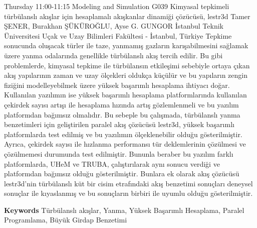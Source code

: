 
    \begin{abstract_basarim}
    {Thursday 11:00-11:15}
    {Modeling and Simulation}
    {G039}
    {Kimyasal tepkimeli türbülanslı akışlar için hesaplamalı akışkanlar dinamiği çözücüsü, lestr3d}
    {%
    Tamer ŞENER, Burakhan ŞÜKÜROĞLU, Ayse G. GUNGOR}
    {%
    }
    {%
    İstanbul Teknik Üniversitesi Uçak ve Uzay Bilimleri Fakültesi - İstanbul, Türkiye}
    Tepkime sonucunda oluşacak türler ile taze, yanmamış gazların karışabilmesini sağlamak üzere yanma odalarında genellikle türbülanslı akış tercih edilir. Bu gibi problemlerde, kimyasal tepkime ile türbülansın etkileşimi sebebiyle ortaya çıkan akış yapılarının zaman ve uzay ölçekleri oldukça küçülür ve bu yapıların zengin fiziğini modelleyebilmek üzere yüksek başarımlı hesaplama ihtiyacı doğar. Kullanılan yazılımın ise yüksek başarımlı hesaplama platformlarında kullanılan çekirdek sayısı artışı ile hesaplama hızında artış gözlemlenmeli ve bu yazılım platformdan bağımsız olmalıdır. Bu sebeple bu çalışmada, türbülanslı yanma benzetimleri için geliştirilen paralel akış çözücüsü lestr3d, yüksek başarımlı platformlarda test edilmiş ve bu yazılımın ölçeklenebilir olduğu gösterilmiştir. Ayrıca, çekirdek sayısı ile hızlanma performansı tür deklemlerinin çözülmesi ve çözülmemesi durumunda test edilmiştir. Bununla beraber bu yazılım farklı platformlarda, UHeM ve TRUBA, çalıştırılarak aynı sonucu verdiği ve platformdan bağımsız olduğu gösterilmiştir. Bunlara ek olarak akış çözücüsü lestr3d’nin türbülanslı küt bir cisim etrafındaki akış benzetimi sonuçları deneysel sonuçlar ile kıyaslanmış ve bu sonuçların birbiri ile uyumlu olduğu gösterilmiştir. 
    
        \textbf{Keywords} \newline{}Türbülanslı akışlar, Yanma, Yüksek Başarımlı Hesaplama, Paralel Programlama, Büyük Girdap Benzetimi
    \end{abstract_basarim}
    